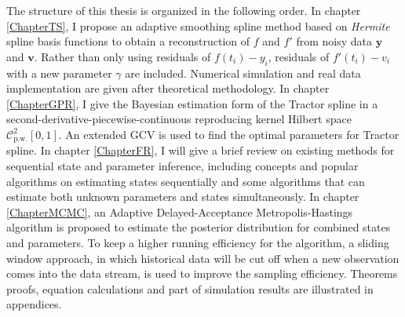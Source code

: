 The structure of this thesis is organized in the following order. In chapter \ref{ChapterTS}, I propose an adaptive smoothing spline method based on \textit{Hermite} spline basis functions to obtain a reconstruction of $f$ and $f'$ from noisy data $\mathbf{y}$ and $\mathbf{v}$. Rather than only using residuals of $f(t_i)-y_i$, residuals of $f'(t_i)-v_i$ with a new parameter $\gamma$ are included. Numerical simulation and real data implementation are given after theoretical methodology. In chapter \ref{ChapterGPR}, I give the Bayesian estimation form of the Tractor spline in a second-derivative-piecewise-continuous reproducing kernel Hilbert space $\mathcal{C}_{\mbox{p.w.}}^2[0,1]$. An extended GCV is used to find the optimal parameters for Tractor spline. In chapter \ref{ChapterFR}, I will give a brief review on existing methods for sequential state and parameter inference, including concepts and popular algorithms on estimating states sequentially and some algorithms that can estimate both unknown parameters and states simultaneously. In chapter \ref{ChapterMCMC}, an Adaptive Delayed-Acceptance Metropolis-Hastings algorithm is proposed to estimate the posterior distribution for combined states and parameters. To keep a higher running efficiency for the algorithm, a sliding window approach, in which historical data will be cut off when a new observation comes into the data stream,  is used to improve the sampling efficiency. Theorems proofs, equation calculations and part of simulation results are illustrated in appendices. 







